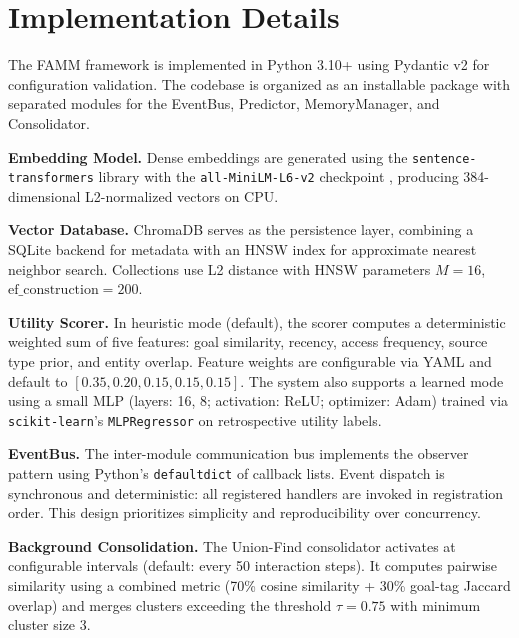 \documentclass[conference]{IEEEtran}
\begin{document}
\section{Implementation Details}
\label{sec:implementation}

The FAMM framework is implemented in Python 3.10+ using Pydantic v2 for configuration validation. The codebase is organized as an installable package with separated modules for the EventBus, Predictor, MemoryManager, and Consolidator.

\textbf{Embedding Model.} Dense embeddings are generated using the \texttt{sentence-transformers} library with the \texttt{all-MiniLM-L6-v2} checkpoint \cite{reimers2019sbert}, producing 384-dimensional L2-normalized vectors on CPU.

\textbf{Vector Database.} ChromaDB serves as the persistence layer, combining a SQLite backend for metadata with an HNSW index for approximate nearest neighbor search. Collections use L2 distance with HNSW parameters $M{=}16$, $\text{ef\_construction}{=}200$.

\textbf{Utility Scorer.} In heuristic mode (default), the scorer computes a deterministic weighted sum of five features: goal similarity, recency, access frequency, source type prior, and entity overlap. Feature weights are configurable via YAML and default to $[0.35, 0.20, 0.15, 0.15, 0.15]$. The system also supports a learned mode using a small MLP (layers: 16, 8; activation: ReLU; optimizer: Adam) trained via \texttt{scikit-learn}'s \texttt{MLPRegressor} on retrospective utility labels.

\textbf{EventBus.} The inter-module communication bus implements the observer pattern using Python's \texttt{defaultdict} of callback lists. Event dispatch is synchronous and deterministic: all registered handlers are invoked in registration order. This design prioritizes simplicity and reproducibility over concurrency.

\textbf{Background Consolidation.} The Union-Find consolidator activates at configurable intervals (default: every 50 interaction steps). It computes pairwise similarity using a combined metric (70\% cosine similarity + 30\% goal-tag Jaccard overlap) and merges clusters exceeding the threshold $\tau{=}0.75$ with minimum cluster size 3.

\end{document}
